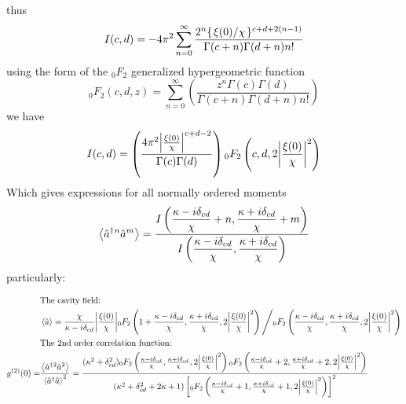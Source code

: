 thus
\begin{equation}
  I(c, d) = -4\pi^2 \sum_{n=0}^\infty \frac{2^n \{\flatfrac{\xi(0)}{\chi}\}^{c+d+2(n-1)}}{\Gamma(c+n)\Gamma(d+n)n!}
\end{equation}
using the form of the $_0F_2$ generalized hypergeometric function \cite{Slater1966} \cite{TISP}
\begin{equation}
  _0F_2(c, d, z) = \sum_{n=0}^\infty \left( \frac{ z^n \Gamma(c) \Gamma(d)}{\Gamma(c+n)\Gamma(d+n)n!} \right)
\end{equation}
we have 
\begin{equation}
  I(c, d) = \left( \frac{4\pi^2 \abs{\frac{\xi(0)}{\chi}}^{c+d-2}}{\Gamma(c)\Gamma(d)} \right) {}_0F_2 \left(c, d, 2\abs{\frac{\xi(0)}{\chi}}^2\right)
\end{equation}
Which gives expressions for all normally ordered moments 
\begin{equation}
  \ev{\cre{}^n \ann^m} = \displaystyle \frac{\displaystyle I\left(\frac{\kappa-i\delta_{cd}}{\chi}+n, \frac{\kappa+i\delta_{cd}}{\chi}+m\right)}{\displaystyle I\left(\frac{\kappa-i\delta_{cd}}{\chi}, \frac{\kappa+i\delta_{cd}}{\chi}\right)}
\end{equation}
particularly:
\begin{widetext}
  \begin{align}
    &\text{The cavity field: }\nonumber\\ 
    &\ev{\ann} = \frac{\chi}{\kappa-i\delta_{cd}} \abs{\frac{\xi(0)}{\chi}} {}_0F_2\left(1+ \frac{\kappa-i\delta_{cd}}{\chi}, \frac{\kappa+i\delta_{cd}}{\chi}, 2\abs{\frac{\xi(0)}{\chi}}^2\right) \Bigg/ {}_0F_2 \left(\frac{\kappa-i\delta_{cd}}{\chi}, \frac{\kappa+i\delta_{cd}}{\chi}, 2\abs{\frac{\xi(0)}{\chi}}^2\right)\label{field_duff}\\
    &\text{The 2nd order correlation function: }\nonumber\\
    g^{(2)}(0) =& \frac{\ev{\cre{}^2 \ann{}^2}}{\ev{\cre\ann}^2} =  \cfrac{(\kappa^2 + \delta_{cd}^2){}_0F_2 \left( \frac{\kappa - i \delta_{cd}}{\chi}, \frac{\kappa+i\delta_{cd}}{\chi}, 2\abs{\frac{\xi(0)}{\chi}}^2 \right) {}_0F_2 \left( \frac{\kappa-i\delta_{cd}}{\chi}+2, \frac{\kappa+i\delta_{cd}}{\chi}+2, 2\abs{\frac{\xi(0)}{\chi}}^2 \right)}{(\kappa^2 + \delta_{cd}^2 + 2 \kappa + 1) \left[{}_0F_2\left(\frac{\kappa-i\delta_{cd}}{\chi}+1, \frac{\kappa+i\delta_{cd}}{\chi}+1, 2\abs{\frac{\xi(0)}{\chi}}^2 \right)\right]^2} \label{g2_duff}
  \end{align}
\end{widetext}

